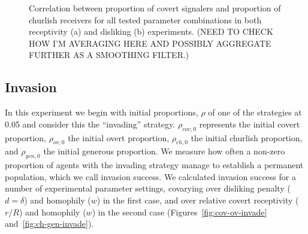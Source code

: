 \documentclass[11pt,letterpaper]{article}
\begin{document}
\begin{figure}[H]
\begin{subfigure}{0.49\textwidth}
    \caption{}
    \label{fig:}
  \end{subfigure}
  \caption{Correlation between proportion of covert signalers and proportion of
    churlish receivers for all tested parameter combinations in both 
    receptivity (a) and disliking (b) experiments. (NEED TO CHECK HOW I'M AVERAGING
    HERE AND POSSIBLY AGGREGATE FURTHER AS A SMOOTHING FILTER.)}
  \label{fig:regressions}
\end{figure}

\subsection{Invasion}

In this experiment we begin with initial proportions, $\rho$ of one of the strategies
at 0.05 and consider this the ``invading'' strategy. $\rho_{cov,0}$ represents
the initial covert proportion, $\rho_{ov,0}$ the initial overt proportion,
$\rho_{ch,0}$ the initial churlish proportion, and $\rho_{gen,0}$ the 
initial generous proportion. We measure how often
a non-zero proportion of agents with the invading strategy manage to 
establish a permanent population, which we call invasion success. We calculated
invasion success for a number of experimental parameter settings, covarying
over disliking penalty ($d=\delta$) and homophily ($w$) in the first case,
and over relative covert receptivity ($r/R$) and homophily ($w$) 
in the second case (Figures~\ref{fig:cov-ov-invade} and~\ref{fig:ch-gen-invade}).
\end{document}
